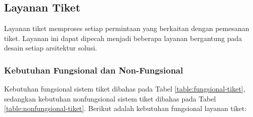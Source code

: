 \pagebreak

\subsection{Layanan Tiket}

Layanan tiket memproses setiap permintaan yang berkaitan dengan pemesanan tiket. Layanan ini dapat dipecah menjadi beberapa layanan bergantung pada desain setiap arsitektur solusi.

\subsubsection{Kebutuhan Fungsional dan Non-Fungsional}

Kebutuhan fungsional sistem tiket dibahas pada Tabel \ref{table:fungsional-tiket}, sedangkan kebutuhan nonfungsional sistem tiket dibahas pada Tabel \ref{table:nonfungsional-tiket}. Berikut adalah kebutuhan fungsional layanan tiket:

